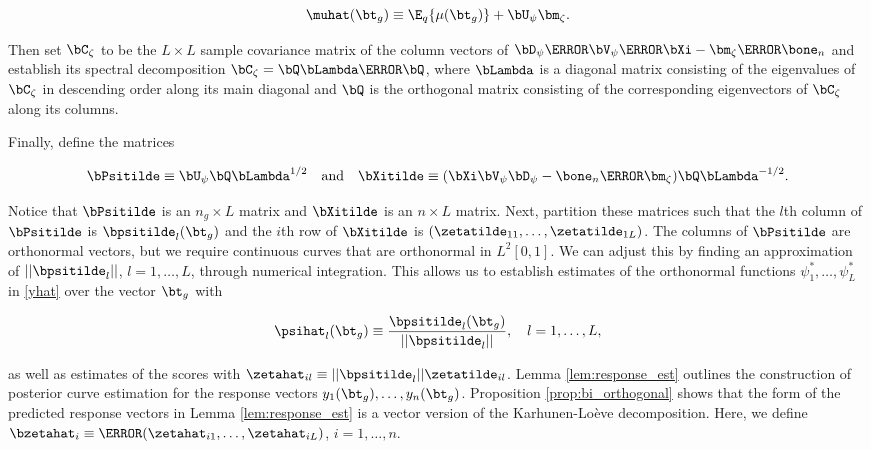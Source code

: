 \documentclass[ba]{imsart}
\numberwithin{equation}{section}
\theoremstyle{plain}
\begin{document}
\begin{equation}
	\muhat (\bt_g) \equiv \E_q \{ \mu (\bt_g) \} + \bU_\psi \bm_\zeta.
\label{mu_shift}
\end{equation}

\noindent Then set $\bC_\zeta$ to be the $L \times L$ sample covariance matrix of the
column vectors of $\bD_\psi \T{\bV}_\psi \T{\bXi} - \bm_\zeta \T{\bone_n}$ and establish its spectral decomposition
$\bC_\zeta = \bQ \bLambda \T{\bQ}$, where
$\bLambda$ is a diagonal matrix consisting of the eigenvalues of $\bC_\zeta$ in descending order along its
main diagonal and $\bQ$ is the orthogonal matrix consisting of the corresponding eigenvectors of $\bC_\zeta$ along
its columns.

Finally, define the matrices

\begin{equation}
	\bPsitilde \equiv \bU_\psi \bQ \bLambda^{1/2} \quad
	\text{and} \quad
	\bXitilde \equiv (\bXi \bV_\psi \bD_\psi - \bone_n \T{\bm_\zeta}) \bQ \bLambda^{-1/2}.
\label{psi_zeta_orth}
\end{equation}

\noindent Notice that $\bPsitilde$ is an $n_g \times L$ matrix and $\bXitilde$ is an $n \times L$ matrix. Next, partition
these matrices such that the $l$th column of $\bPsitilde$ is $\bpsitilde_l (\bt_g)$ and the $i$th row of $\bXitilde$ is
$(\zetatilde_{11}, \dots, \zetatilde_{1L})$.
The columns of $\bPsitilde$ are orthonormal vectors, but we require continuous curves that are orthonormal in
$L^2 [0, 1]$. We can adjust this by finding an approximation of $|| \bpsitilde_l ||$, $l = 1, \dots, L$, through numerical
integration. This allows us to establish estimates of the orthonormal functions $\psi^*_1, \dots, \psi^*_L$ in
\eqref{yhat} over the vector $\bt_g$ with

\begin{equation}
	\psihat_l (\bt_g) \equiv \frac{\bpsitilde_l (\bt_g)}{|| \bpsitilde_l ||}, \quad l = 1, \dots, L,
\label{psi_star}
\end{equation}

\noindent as well as estimates of the scores with
$\zetahat_{il} \equiv || \bpsitilde_l || \zetatilde_{il}$.
Lemma \ref{lem:response_est} outlines the construction of posterior curve estimation for the
response vectors $y_1 (\bt_g),
\dots, y_n (\bt_g)$. Proposition \ref{prop:bi_orthogonal} shows that the form of the predicted response vectors
in Lemma \ref{lem:response_est} is a vector version of the Karhunen-Lo\`{e}ve decomposition. Here, we define
$\bzetahat_i \equiv \T{(\zetahat_{i1}, \dots, \zetahat_{iL})}$, $i = 1, \dots, n$.
\end{document}
